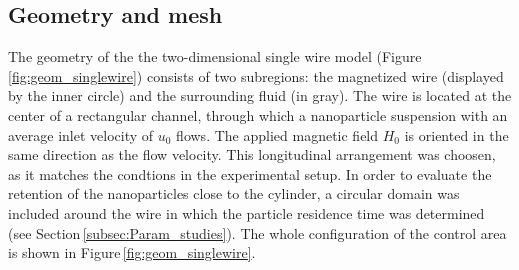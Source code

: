\subsection{Geometry and mesh}
\label{subsec:geom}
The geometry of the the two-dimensional single wire model (Figure\,\ref{fig:geom_singlewire}) consists of two subregions: the magnetized wire (displayed by the inner circle) and the surrounding fluid (in gray). The wire is located at the center of a rectangular channel, through which a nanoparticle suspension with an average inlet velocity of $u_{0}$ flows. The applied magnetic field $H_{0}$ is oriented in the same direction as the flow velocity. This longitudinal arrangement was choosen, as it matches the condtions in the experimental setup. In order to evaluate the retention of the nanoparticles close to the cylinder, a circular domain was included around the wire in which the particle residence time was determined (see Section\,\ref{subsec:Param_studies}). The whole configuration of the control area is shown in Figure\,\ref{fig:geom_singlewire}.

\begin{figure}[H]
\centering
{}
\end{figure}

